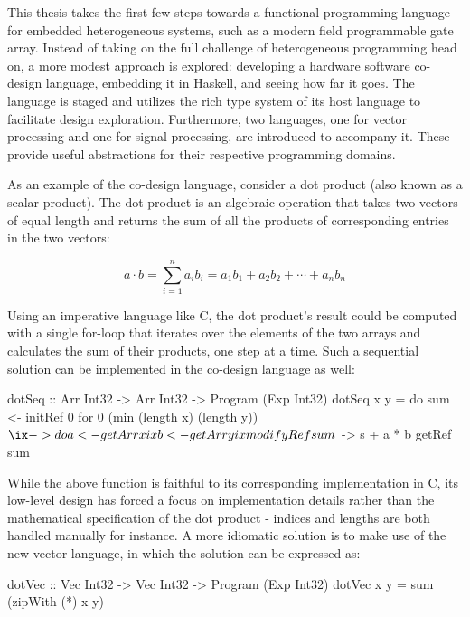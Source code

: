 \documentclass[../paper.tex]{subfiles}
\begin{document}
This thesis takes the first few steps towards a functional programming language for embedded heterogeneous systems, such as a modern field programmable gate array. Instead of taking on the full challenge of heterogeneous programming head on, a more modest approach is explored: developing a hardware software co-design language, embedding it in Haskell, and seeing how far it goes. The language is staged and utilizes the rich type system of its host language to facilitate design exploration. Furthermore, two languages, one for vector processing and one for signal processing, are introduced to accompany it. These provide useful abstractions for their respective programming domains.

As an example of the co-design language, consider a dot product (also known as a scalar product). The dot product is an algebraic operation that takes two vectors of equal length and returns the sum of all the products of corresponding entries in the two vectors:

\begin{equation}
a \cdot b = \sum_{i=1}^{n}a_{i}b_{i} = a_{1}b_{1} + a_{2}b_{2} + \cdots + a_{n}b_{n}
\end{equation}

Using an imperative language like C, the dot product's result could be computed with a single for-loop that iterates over the elements of the two arrays and calculates the sum of their products, one step at a time. Such a sequential solution can be implemented in the co-design language as well:

\begin{code}
dotSeq :: Arr Int32 -> Arr Int32 -> Program (Exp Int32)
dotSeq x y = do
  sum <- initRef 0
  for 0 (min (length x) (length y)) $ \ix -> do
    a <- getArr x ix
    b <- getArr y ix
    modifyRef sum $ \s -> s + a * b
  getRef sum
\end{code}

While the above function is faithful to its corresponding implementation in C, its low-level design has forced a focus on implementation details rather than the mathematical specification of the dot product - indices and lengths are both handled manually for instance. A more idiomatic solution is to make use of the new vector language, in which the solution can be expressed as:

\begin{code}
dotVec :: Vec Int32 -> Vec Int32 -> Program (Exp Int32)
dotVec x y = sum (zipWith (*) x y)
\end{code}
\end{document}
